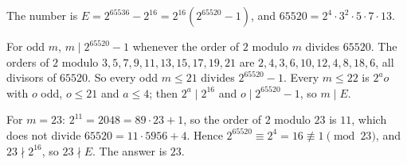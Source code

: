 The number is $E=2^{65536}-2^{16}=2^{16}\left(2^{65520}-1\right)$, and $65520=2^4\cdot3^2\cdot5\cdot7\cdot13$.

For odd $m$, $m\mid2^{65520}-1$ whenever the order of $2$ modulo $m$ divides $65520$. The orders of $2$ modulo $3,5,7,9,11,13,15,17,19,21$ are $2,4,3,6,10,12,4,8,18,6$, all divisors of $65520$. So every odd $m\le21$ divides $2^{65520}-1$. Every $m\le22$ is $2^ao$ with $o$ odd, $o\le21$ and $a\le4$; then $2^a\mid2^{16}$ and $o\mid2^{65520}-1$, so $m\mid E$.

For $m=23$: $2^{11}=2048=89\cdot23+1$, so the order of $2$ modulo $23$ is $11$, which does not divide $65520=11\cdot5956+4$. Hence $2^{65520}\equiv2^4=16\not\equiv1\pmod{23}$, and $23\nmid2^{16}$, so $23\nmid E$. The answer is $\boxed{23}$.
